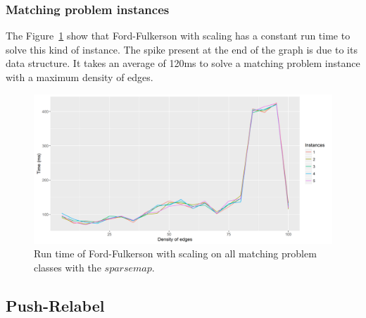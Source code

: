 \subsubsection{Matching problem instances}
The Figure~\ref{fig:ffmatching} show that Ford-Fulkerson with scaling has a constant run time to solve this kind of instance. The spike present at the end of the graph is due to its data structure. It takes an average of 120ms to solve a matching problem instance with a maximum density of edges.
\begin{figure}[H]
\begin{center}
\includegraphics[scale=0.5]{images/results/ffmatching.png}
\caption{Run time of Ford-Fulkerson with scaling on all matching problem classes with the $sparse map$.}
\label{fig:ffmatching}
\end{center}
\end{figure}


\subsection{Push-Relabel}
